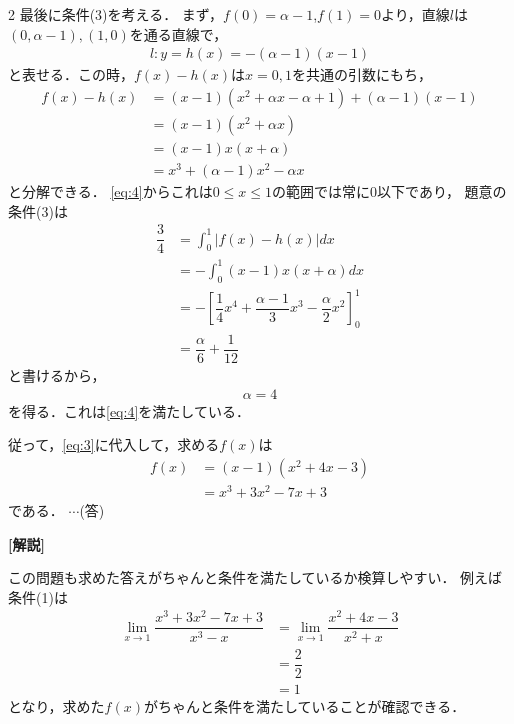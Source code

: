 \documentclass[../../main.tex]{subfiles}
\begin{document}
\begin{multicols}{2}
  最後に条件(3)を考える．
  まず，$f(0)=\alpha-1$,$f(1)=0$より，直線$l$は
  $(0,\alpha-1),(1,0)$を通る直線で，
  \begin{align}
    l: y = h(x) = -(\alpha-1)(x-1)
  \end{align}
  と表せる．この時，$f(x)-h(x)$は$x=0,1$を共通の引数にもち，
  \begin{align}
    f(x)-h(x)
    & =(x-1)(x^2 + \alpha x -\alpha +1) + (\alpha-1)(x-1) \\
    & =(x-1)\left(x^2+\alpha x \right)                    \\
    & =(x-1)x(x+\alpha)                                   \\
    & = x^3 + (\alpha-1)x^2 -\alpha x
  \end{align}
  と分解できる．
  \cref{eq:4}からこれは$0\le x\le 1$の範囲では常に$0$以下であり，
  題意の条件(3)は
  \begin{align}
    \dfrac{3}{4}
    & =\int_0^1 |f(x)-h(x)|dx                                                        \\
    & =-\int_0^1 (x-1)x(x+\alpha) dx                                                 \\
    & =-\left[ \dfrac{1}{4}x^4+\dfrac{\alpha-1}{3} x^3-\dfrac{\alpha}{2}x^2 \right]_0^1 \\
    & = \dfrac{\alpha}{6} + \dfrac{1}{12}
  \end{align}
  と書けるから，
  \begin{align}
    \alpha = 4
  \end{align}
  を得る．これは\cref{eq:4}を満たしている．

  従って，\cref{eq:3}に代入して，求める$f(x)$は
  \begin{align}
    f(x)
    & =(x-1)(x^2 + 4 x -3) \\
    & =x^3 + 3x^2 -7x +3
  \end{align}
  である．  $\cdots$(答)

  {\bf [解説]}

  この問題も求めた答えがちゃんと条件を満たしているか検算しやすい．
  例えば条件(1)は
  \begin{align}
    \lim_{x\to 1}\dfrac{x^3 + 3x^2 -7x +3}{x^3-x}
    & =\lim_{x\to 1} \dfrac{x^2+4x-3}{x^2+x} \\
    & = \dfrac{2}{2}                         \\
    & = 1
  \end{align}
  となり，求めた$f(x)$がちゃんと条件を満たしていることが確認できる．

  \newpage
\end{multicols}
\end{document}
